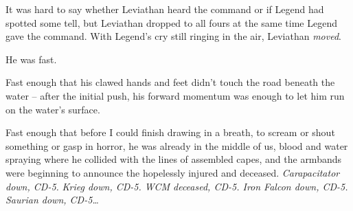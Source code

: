 It was hard to say whether Leviathan heard the command or if Legend had spotted some tell, but Leviathan dropped to all fours at the same time Legend gave the command. With Legend's cry still ringing in the air, Leviathan \emph{moved}.



He was fast.



Fast enough that his clawed hands and feet didn't touch the road beneath the water – after the initial push, his forward momentum was enough to let him run on the water's surface.



Fast enough that before I could finish drawing in a breath, to scream or shout something or gasp in horror, he was already in the middle of us, blood and water spraying where he collided with the lines of assembled capes, and the armbands were beginning to announce the hopelessly injured and deceased.  \emph{Carapacitator down, CD-5.  }\emph{Krieg down, CD-5.  WCM deceased, CD-5.  Iron Falcon down, CD-5.  Saurian down, CD-5\ldots}





